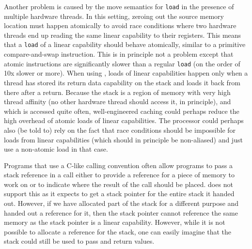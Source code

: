 Another problem is caused by the move semantics for \texttt{load} in the presence of multiple hardware threads.
In this setting, zeroing out the source memory location must happen atomically to avoid race conditions where two hardware threads end up reading the same linear capability to their registers.
This means that a \texttt{load} of a linear capability should behave atomically, similar to a primitive compare-and-swap instruction.
This is in principle not a problem except that atomic instructions are significantly slower than a regular \texttt{load} (on the order of 10x slower or more).
When using \stktokens{}, loads of linear capabilities happen only when a thread has stored its return data capability on the stack and loads it back from there after a return.
Because the stack is a region of memory with very high thread affinity (no other hardware thread should access it, in principle), and which is accessed quite often, well-engineered caching could perhaps reduce the high overhead of atomic loads of linear capabilities.
The processor could perhaps also (be told to) rely on the fact that race conditions should be impossible for loads from linear capabilities (which should in principle be non-aliased) and just use a non-atomic load in that case.

\begin{jversion}
Programs that use a C-like calling convention often allow programs to pass a stack reference in a call either to provide a reference for a piece of memory to work on or to indicate where the result of the call should be placed.
\stktokens{} does not support this as it expects to get a stack pointer for the entire stack it handed out.
However, if we have allocated part of the stack for a different purpose and handed out a reference for it, then the stack pointer cannot reference the same memory as the stack pointer is a linear capability.
However, while it is not possible to allocate a reference for the stack, one can easily imagine that the stack could still be used to pass and return values.
\end{jversion}


